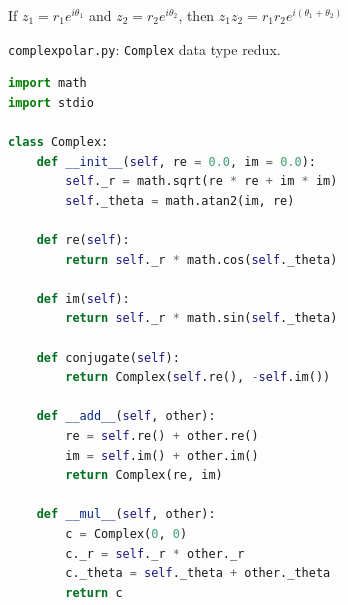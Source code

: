 \documentclass[8pt,a4paper,compress]{beamer}
\begin{document}
\begin{frame}[fragile]
\begin{minipage}{200pt}
If $z_1 = r_1e^{i\theta_1}$ and $z_2 = r_2e^{i\theta_2}$, then $z_1 z_2 = r_1 r_2 e^{i(\theta_1 + \theta_2)}$
\end{minipage}%
\hfill
\begin{minipage}{100pt}
\begin{center}
\end{center}
\end{minipage}%
\end{frame}

\begin{frame}[fragile]
\pause

\begin{framed}
\tiny \lstinline{complexpolar.py}: \lstinline{Complex} data type redux. 
\end{framed}

\begin{lstlisting}[language=Python,style=focusin]
import math
import stdio

class Complex:
    def __init__(self, re = 0.0, im = 0.0):
        self._r = math.sqrt(re * re + im * im)
        self._theta = math.atan2(im, re)

    def re(self):
        return self._r * math.cos(self._theta)

    def im(self):
        return self._r * math.sin(self._theta)

    def conjugate(self):
        return Complex(self.re(), -self.im())

    def __add__(self, other):
        re = self.re() + other.re()
        im = self.im() + other.im()
        return Complex(re, im)

    def __mul__(self, other):
        c = Complex(0, 0)
        c._r = self._r * other._r
        c._theta = self._theta + other._theta
        return c
\end{lstlisting}
\end{frame}
\end{document}
